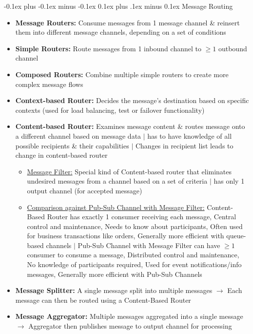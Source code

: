 \documentclass[landscape]{article}
\makeatletter
\renewcommand{\subsection}{\@startsection{subsection}{2}{0mm}%
  {-0.1ex plus -0.1ex minus -0.1ex}%
  {0.1ex plus .1ex minus 0.1ex}%
{\normalfont\scriptsize\bfseries}}
\makeatother
\begin{document}
\begin{multicols*}{5}
    \subsection{Message Routing}
    \begin{itemize}
      \item \textbf{Message Routers:} Consume messages from 1 message channel \& reinsert them into different message channels, depending on a set of conditions
      \item \textbf{Simple Routers:} Route messages from 1 inbound channel to $\geq 1$ outbound channel
      \item \textbf{Composed Routers:} Combine multiple simple routers to create more complex message flows
      \item \textbf{Context-based Router:} Decides the message's destination based on specific contexts (used for load balancing, test or failover functionality)
      \item \textbf{Content-based Router:} Examines message content \& routes message onto a different channel based on message data $|$ has to have knowledge of all possible recipients \& their capabilities $|$ Changes in recipient list leads to change in content-based router
      \begin{itemize}
        \item \underline{Message Filter:} Special kind of Content-based router that eliminates undesired messages from a channel based on a set of criteria $|$ has only 1 output channel (for accepted message)
        \item \underline{Comparison against Pub-Sub Channel with Message Filter:} Content-Based Router has exactly 1 consumer receiving each message, Central control and maintenance, Needs to know about participants, Often used for business transactions like orders, Generally more efficient with queue-based channels $|$ Pub-Sub Channel with Message Filter can have $\geq 1$ consumer to consume a message, Distributed control and maintenance, No knowledge of participants required, Used for event notifications/info messages, Generally more efficient with Pub-Sub Channels
      \end{itemize}
      \item \textbf{Message Splitter:} A single message split into multiple messages $\rightarrow$ Each message can then be routed using a Content-Based Router
      \item \textbf{Message Aggregator:} Multiple messages aggregated into a single message $\rightarrow$ Aggregator then publishes message to output channel for processing

\end{itemize}
\end{multicols*}
\end{document}
